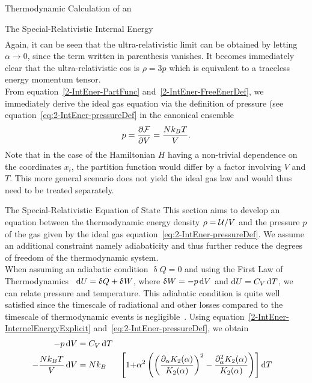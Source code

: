 \begin{section}{Thermodynamic Calculation of an \texorpdfstring{}{EoS}}
\begin{subsection}{The Special-Relativistic Internal Energy}
\begin{align}
\end{align}
Again, it can be seen that the ultra-relativistic limit can be obtained by letting $\alpha\rightarrow0$, since the term written in parenthesis vanishes.
It becomes immediately clear that the ultra-relativistic \ac{eos} is $\rho=3p$ which is equivalent to a traceless energy momentum tensor.\\
From equation~\eqref{2-IntEner-PartFunc} and~\eqref{2-IntEner-FreeEnerDef}, we immediately derive the ideal gas equation via the definition of pressure (see equation~\eqref{eq:2-IntEner-pressureDef} in the canonical ensemble
\begin{equation}
    p=\frac{\partial\mathcal{F}}{\partial V} = \frac{Nk_ BT}{V}.
    \label{eq:2-IntEner-IdealGasEq}
\end{equation}
Note that in the case of the Hamiltonian $H$ having a non-trivial dependence on the coordinates $x_i$, the partition function would differ by a factor involving $V$ and $T$.
This more general scenario does not yield the ideal gas law and would thus need to be treated separately.
\end{subsection}
%
%
%
\begin{subsection}{The Special-Relativistic Equation of State}
\label{2-IntEner-SR-EOS-Derivation}
This section aims to develop an equation between the thermodynamic energy density $\rho=\mathcal{U}/V$ and the pressure $p$ of the gas given by the ideal gas equation~\eqref{eq:2-IntEner-pressureDef}.
We assume an additional constraint namely adiabaticity and thus further reduce the degrees of freedom of the thermodynamic system.\\ %
When assuming an adiabatic condition $\updelta Q=0$ and using the First Law of Thermodynamics~\cite{fliessbachStatistischePhysikLehrbuch2018} $\mathop{}\!\mathrm{d} U =\updelta Q + \updelta W$, where $\updelta W=-p\mathop{}\!\mathrm{d} V$ and $\mathop{}\!\mathrm{d} U=C_V\mathop{}\!\mathrm{d} T$, we can relate pressure and temperature. 
This adiabatic condition is quite well satisfied since the timescale of radiational and other losses compared to the timescale of thermodynamic events is negligible~\cite{noerdlingerSolarMassLoss2008, vinkMassLossStellar2017}.
Using equation~\eqref{2-IntEner-InternelEnergyExplicit} and~\eqref{eq:2-IntEner-pressureDef}, we obtain
\begin{alignat}{3}
    -p\diff V &= C_V\diff T\\
    -\frac{Nk_B T}{V}\diff V &= Nk_B &\Biggl[1 + &\alpha^2\left(\left(\frac{\partial_\alpha K_2(\alpha)}{K_2(\alpha)}\right)^2 - \frac{\partial^2_\alpha K_2(\alpha)}{K_2(\alpha)}\right)\Biggr]\diff T\\

\end{alignat}
\end{subsection}
\end{section}
